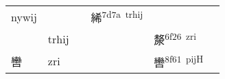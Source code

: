 \documentclass[14pt,a4paper]{scrartcl}
\begin{document}
\begin{longtable}[c]{@{}llllll@{}}
\begin{minipage}[t]{0.14\columnwidth}\raggedright\strut
nywij
\strut\end{minipage} &
\begin{minipage}[t]{0.14\columnwidth}\raggedright\strut
\strut\end{minipage} &
\begin{minipage}[t]{0.14\columnwidth}\raggedright\strut
\strut\end{minipage} &
\begin{minipage}[t]{0.14\columnwidth}\raggedright\strut
絺\textsuperscript{7d7a~trhij}
\strut\end{minipage} &
\begin{minipage}[t]{0.14\columnwidth}\raggedright\strut
\strut\end{minipage}\tabularnewline
\begin{minipage}[t]{0.14\columnwidth}\raggedright\strut
𠩺
\strut\end{minipage} &
\begin{minipage}[t]{0.14\columnwidth}\raggedright\strut
trhij
\strut\end{minipage} &
\begin{minipage}[t]{0.14\columnwidth}\raggedright\strut
\strut\end{minipage} &
\begin{minipage}[t]{0.14\columnwidth}\raggedright\strut
\strut\end{minipage} &
\begin{minipage}[t]{0.14\columnwidth}\raggedright\strut
漦\textsuperscript{6f26~zri}
\strut\end{minipage} &
\begin{minipage}[t]{0.14\columnwidth}\raggedright\strut
\strut\end{minipage}\tabularnewline
\begin{minipage}[t]{0.14\columnwidth}\raggedright\strut
轡
\strut\end{minipage} &
\begin{minipage}[t]{0.14\columnwidth}\raggedright\strut
zri
\strut\end{minipage} &
\begin{minipage}[t]{0.14\columnwidth}\raggedright\strut
\strut\end{minipage} &
\begin{minipage}[t]{0.14\columnwidth}\raggedright\strut
\strut\end{minipage} &
\begin{minipage}[t]{0.14\columnwidth}\raggedright\strut
轡\textsuperscript{8f61~pijH}

\end{minipage}
\end{longtable}
\end{document}
